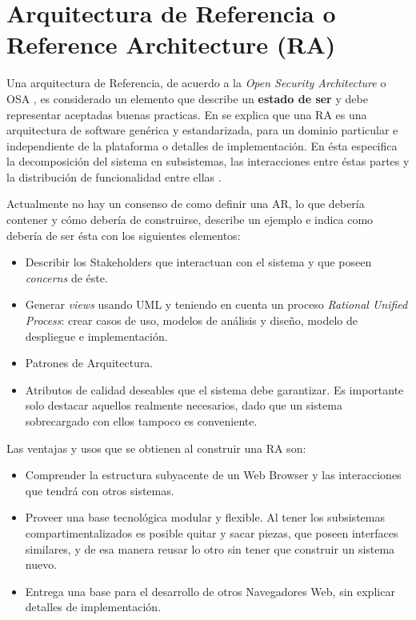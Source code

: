 

\section{Arquitectura de Referencia o Reference Architecture (RA)}
\label{chap2:ArqRef}

Una arquitectura de Referencia, de acuerdo a la \textit{Open Security Architecture} o OSA \cite{openSecArch}, es considerado un elemento que describe un \textbf{estado de ser} y debe representar aceptadas buenas practicas. En \cite{Avgeriou2003, Galster2011a} se explica que una RA es una arquitectura de software genérica y estandarizada, para un dominio particular e independiente de la plataforma o detalles de implementación. En ésta especifica la decomposición del sistema en subsistemas, las interacciones entre éstas partes y la distribución de funcionalidad entre ellas \cite{Bass2012}. 

Actualmente no hay un consenso de como definir una AR, lo que debería contener y cómo debería de construirse, \cite{Avgeriou2003, Galster2011a} describe un ejemplo e indica como debería de ser ésta con los siguientes elementos:
\begin{itemize}
    \item Describir los Stakeholders que interactuan con el sistema y que poseen \textit{concerns} de éste.
    \item Generar \textit{views} usando UML y teniendo en cuenta un proceso \textit{Rational Unified Process}: crear casos de uso, modelos de análisis y diseño, modelo de despliegue e implementación.
    \item Patrones de Arquitectura.
    \item Atributos de calidad deseables que el sistema debe garantizar. Es importante solo destacar aquellos realmente necesarios, dado que un sistema sobrecargado con ellos tampoco es conveniente.
\end{itemize}

Las ventajas y usos que se obtienen al construir una RA son:
\begin{itemize}
    \item Comprender la estructura subyacente de un Web Browser y las interacciones que tendrá con otros sistemas.
    \item Proveer una base tecnológica modular y flexible. Al tener los subsistemas compartimentalizados es posible quitar y sacar piezas, que poseen interfaces similares, y de esa manera reusar lo otro sin tener que construir un sistema nuevo.
    \item Entrega una base para el desarrollo de otros Navegadores Web, sin explicar detalles de implementación.
\end{itemize}

